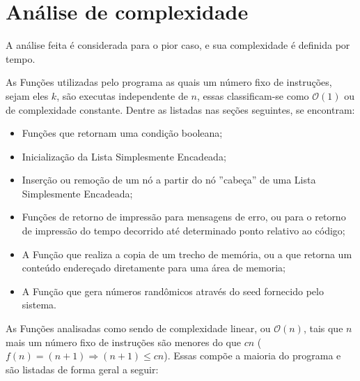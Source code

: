 \documentclass[12pt,a4paper]{article}
\begin{document}
\section{Análise de complexidade}

A análise feita é considerada para o pior caso, e sua complexidade é definida por tempo.

As Funções utilizadas pelo programa as quais um número fixo de instruções, sejam eles $k$, são executas independente de $n$, essas classificam-se como $\mathcal{O}(1)$ ou de complexidade constante. Dentre as listadas nas seções seguintes, se encontram:

\begin{itemize}
	\setlength\itemsep{1pt}
	\item Funções que retornam uma condição booleana; 
	\item Inicialização da Lista Simplesmente Encadeada;
	\item Inserção ou remoção de um nó a partir do nó ''cabeça'' de uma Lista Simplesmente Encadeada;
	\item Funções de retorno de impressão para mensagens de erro, ou para o retorno de impressão do tempo decorrido até determinado ponto relativo ao código;
	\item A Função que realiza a copia de um trecho de memória, ou a que retorna um conteúdo endereçado diretamente para uma área de memoria;
	\item A Função que gera números randômicos através do seed fornecido pelo sistema.
\end{itemize}

As Funções analisadas como sendo de complexidade linear, ou $\mathcal{O}(n)$, tais que $n$ mais um número fixo de instruções são menores do que $cn$ ($f(n) = (n+1) \Rightarrow (n+1) \leqslant cn$). Essas compõe a maioria do programa e são listadas de forma geral a seguir:
\end{document}
